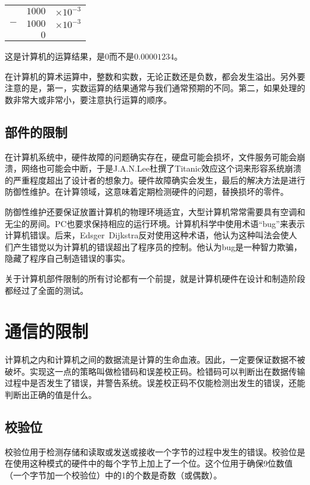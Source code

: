 \begin{table}[!h]
\centering
\begin{tabular}{rrl}
	& $1000$	&$\times 10^{-3}$	\\
$-$& $1000$	&$\times 10^{-3}$	\\
\hline
	& $0$			& 						\\
\end{tabular}
\end{table}

这是计算机的运算结果，是0而不是$0.00001234$。

在计算机的算术运算中，整数和实数，无论正数还是负数，都会发生溢出。另外要注意的是，第一，实数运算的结果通常与我们通常预期的不同。第二，如果处理的数非常大或非常小，要注意执行运算的顺序。

\section{部件的限制}

在计算机系统中，硬件故障的问题确实存在，硬盘可能会损坏，文件服务可能会崩溃，网络也可能会中断，于是J.A.N.Lee杜撰了Titanic效应这个词来形容系统崩溃的严重程度超出了设计者的想象力。硬件故障确实会发生，最后的解决方法是进行防御性维护。在计算领域，这意味着定期检测硬件的问题，替换损坏的零件。

防御性维护还要保证放置计算机的物理环境适宜，大型计算机常常需要具有空调和无尘的房间。PC也要求保持相应的运行环境。计算机科学中使用术语“bug”来表示计算机错误。后来，Edsger~Dijkstra反对使用这种术语，他认为这种叫法会使人们产生错觉以为计算机的错误超出了程序员的控制。他认为bug是一种智力欺骗，隐藏了程序自己制造错误的事实。

关于计算机部件限制的所有讨论都有一个前提，就是计算机硬件在设计和制造阶段都经过了全面的测试。

\chapter{通信的限制}

计算机之内和计算机之间的数据流是计算的生命血液。因此，一定要保证数据不被破坏。实现这一点的策略叫做检错码和误差校正码。检错码可以判断出在数据传输过程中是否发生了错误，并警告系统。误差校正码不仅能检测出发生的错误，还能判断出正确的值是什么。

\section{校验位}

校验位用于检测存储和读取或发送或接收一个字节的过程中发生的错误。校验位是在使用这种模式的硬件中的每个字节上加上了一个位。这个位用于确保9位数值（一个字节加一个校验位）中的1的个数是奇数（或偶数）。

